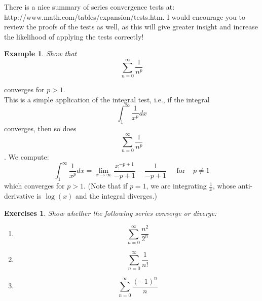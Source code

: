\documentclass[12pt,a4paper]{article} %
\newtheorem{example}{Example}
\newtheorem{exer}{Exercises}
\begin{document}
There is a nice summary of series convergence tests at: http://www.math.com/tables/expansion/tests.htm.  I would encourage you to review the proofs of the tests as well, as this will give greater insight and increase the likelihood of applying the tests correctly!
\begin{example}
Show that $$\sum_{n=0}^\infty \frac{1}{n^p}$$ 
\end{example}
converges for $p>1$.\\
This is a simple application of the integral test, i.e., if the integral
$$\int_{1}^\infty \frac{1}{x^p} dx$$
converges, then so does 
$$\sum_{n=0}^\infty \frac{1}{n^p}$$.
We compute:
$$\int_{1}^\infty \frac{1}{x^p} dx = \lim_{x\rightarrow\infty} \frac{x^{-p+1}}{-p+1} - \frac{1}{-p+1} \;\;\;\;\; \mathrm{for} \;\;\;\; p\neq 1$$
which converges for $p>1$. (Note that if $p=1$, we are integrating $\frac{1}{x}$, whose anti-derivative is $\log(x)$ and the integral diverges.)
\begin{exer}
Show whether the following series converge or diverge:
\end{exer}
\begin{enumerate}
\item $$\sum_{n=0}^\infty \frac{n^2}{2^n}$$
\item $$\sum_{n=0}^\infty \frac{1}{n!}$$
\item $$\sum_{n=0}^\infty \frac{(-1)^n}{n}$$
\end{enumerate}
\end{document}
